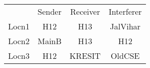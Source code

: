 \begin{tabular}{| c | c | c | c |}
& Sender & Receiver & Interferer\\
Locn1 & H12 & H13 & JalVihar\\
Locn2 & MainB & H13 & H12\\
Locn3 & H12 & KRESIT & OldCSE\\
\end{tabular}
